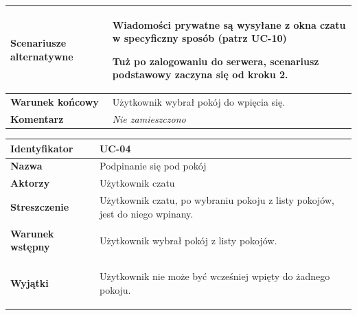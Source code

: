 {\begin{tabularx}{\textwidth}{|l|X|}
	\hline
		\textbf{Scenariusze alternatywne} &
			\begin{enumreq}
				\item Wiadomości prywatne są wysyłane z okna czatu w
				specyficzny sposób (patrz UC-10)
				\item Tuż po zalogowaniu do serwera, scenariusz podstawowy zaczyna się
				od kroku 2.
			\end{enumreq}
		\\

	\hline
		\textbf{Warunek końcowy} &
			Użytkownik wybrał pokój do wpięcia się.
		\\

	\hline
		\textbf{Komentarz} &
			\textit{Nie zamieszczono}
		\\

	\hline
\end{tabularx}

\vspace{2em}

\begin{tabular}{ | l | l | }
	\hline
		\textbf{Identyfikator} &
		UC-04
		\\

	\hline
		\textbf{Nazwa} &
		Podpinanie się pod pokój
		\\

	\hline
		\textbf{Aktorzy} & \parbox[t]{11cm}{
			Użytkownik czatu
		}\\

	\hline
		\textbf{Streszczenie} & \parbox[t]{11cm}{
			Użytkownik czatu, po wybraniu pokoju z listy pokojów, jest
			do niego wpinany.

		}\\

	\hline
		\textbf{Warunek wstępny} & \parbox[t]{11cm}{
			\begin{enumreq}
				\item Użytkownik wybrał pokój z listy pokojów.
			\end{enumreq}

		}
		\\

	\hline
		\textbf{Wyjątki} & \parbox[t]{11cm}{
			\begin{enumreq}
				\item Użytkownik nie może być wcześniej wpięty do żadnego pokoju.
			\end{enumreq}

		}
		\\


\end{tabular}}
